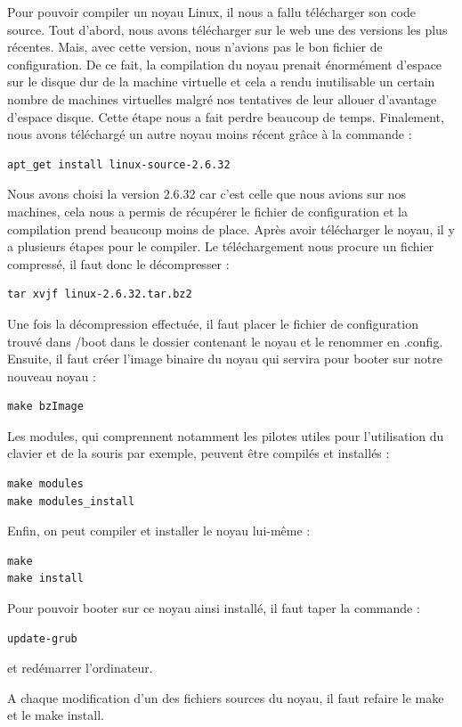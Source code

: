 \documentclass[a4paper]{article}
\begin{document}
Pour pouvoir compiler un noyau Linux, il nous a fallu télécharger son code source. 
Tout d'abord, nous avons télécharger sur le web une des versions les plus récentes. 
Mais, avec cette version, nous n'avions pas le bon fichier de configuration. De ce fait, 
la compilation du noyau prenait énormément d'espace sur le disque dur de la machine virtuelle 
et cela a rendu inutilisable un certain nombre de machines virtuelles malgré nos tentatives 
de leur allouer d'avantage d'espace disque. Cette étape nous a fait perdre beaucoup de temps.
Finalement, nous avons téléchargé un autre noyau moins récent grâce à la commande :
\begin{verbatim}
apt_get install linux-source-2.6.32
\end{verbatim}
Nous avons choisi la version 2.6.32 car c'est celle que nous avions sur nos machines, 
cela nous a permis de récupérer le fichier de configuration et la compilation prend beaucoup moins de place.
Après avoir télécharger le noyau, il y a plusieurs étapes pour le compiler. 
Le téléchargement nous procure un fichier compressé, il faut donc le décompresser :
\begin{verbatim}
tar xvjf linux-2.6.32.tar.bz2
\end{verbatim}
Une fois la décompression effectuée, il faut placer le fichier de configuration trouvé dans /boot dans le dossier contenant le noyau et le renommer en .config.
Ensuite, il faut créer l'image binaire du noyau qui servira pour booter sur notre nouveau noyau :
\begin{verbatim}
make bzImage
\end{verbatim}
Les modules, qui comprennent notamment les pilotes utiles pour l'utilisation du clavier et de la souris par exemple, peuvent être compilés et installés :
\begin{verbatim}
make modules
make modules_install
\end{verbatim}
Enfin, on peut compiler et installer le noyau lui-même :
\begin{verbatim}
make
make install
\end{verbatim}
Pour pouvoir booter sur ce noyau ainsi installé, il faut taper la commande :
\begin{verbatim}
update-grub
\end{verbatim}
et redémarrer l'ordinateur.

A chaque modification d'un des fichiers sources du noyau, il faut refaire le make et le make install.
\end{document}
